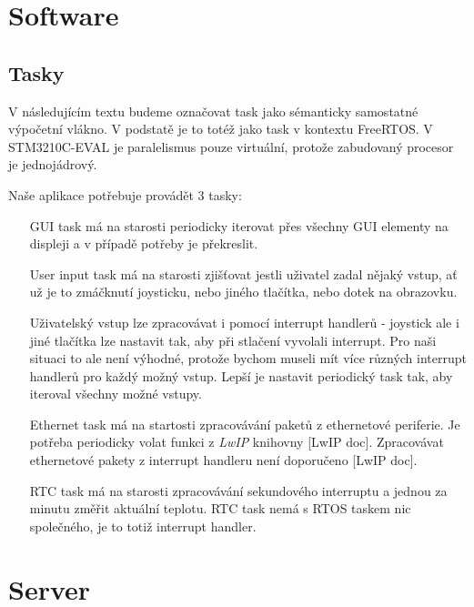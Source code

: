 \section{Software}

\subsection{Tasky}
V následujícím textu budeme označovat task jako sémanticky samostatné výpočetní
vlákno.
V podstatě je to totéž jako task v kontextu FreeRTOS.
V STM3210C-EVAL je paralelismus pouze virtuální, protože zabudovaný procesor je
jednojádrový.

Naše aplikace potřebuje provádět 3 tasky:
\begin{itemize}
    \item[GUI task] má na starosti periodicky iterovat přes všechny GUI elementy
        na displeji a v případě potřeby je překreslit.

    \item[User input task] má na starosti zjišťovat jestli uživatel zadal nějaký
        vstup, ať už je to zmáčknutí joysticku, nebo jiného tlačítka, nebo dotek
        na obrazovku.

        Uživatelský vstup lze zpracovávat i pomocí interrupt handlerů - joystick
        ale i jiné tlačítka lze nastavit tak, aby při stlačení vyvolali interrupt.
        Pro naši situaci to ale není výhodné, protože bychom museli mít více různých
        interrupt handlerů pro každý možný vstup.
        Lepší je nastavit periodický task tak, aby iteroval všechny možné vstupy. 

    \item[Ethernet task] má na startosti zpracovávání paketů z ethernetové
        periferie. Je potřeba periodicky volat funkci z \textit{LwIP} knihovny [LwIP doc].
        Zpracovávat ethernetové pakety z interrupt handleru není doporučeno [LwIP doc].

    \item[RTC task] má na starosti zpracovávání sekundového interruptu a jednou za
        minutu změřit aktuální teplotu. RTC task nemá s RTOS taskem nic společného, je
        to totiž interrupt handler.
\end{itemize}



\section{Server}

